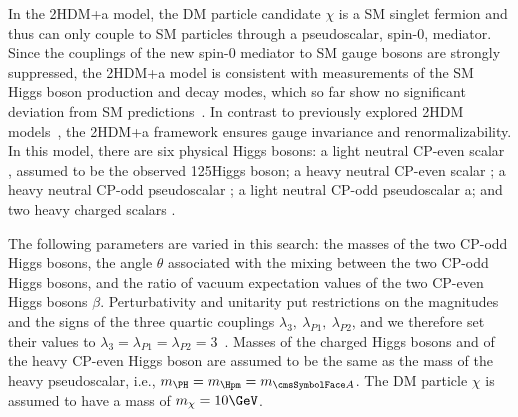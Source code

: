 In the 2HDM+a model, the DM particle candidate $\chi$ is a SM singlet
fermion and thus can only couple to SM particles through a
pseudoscalar, spin-0, mediator. Since the couplings of the new spin-0
mediator to SM gauge bosons are strongly suppressed, the 2HDM+a model
is consistent with  measurements of the SM Higgs boson production and
decay modes, which so far show no significant deviation from SM predictions~\cite{Khachatryan:2016vau}. In contrast to previously explored 2HDM models~\cite{2HDM,Aaboud:2017yqz,Sirunyan:2017hnk}, the 2HDM+a framework ensures gauge invariance and renormalizability. In this model, there are six physical Higgs bosons:
a light neutral CP-even scalar \Ph, assumed to be the
observed 125\GeV Higgs boson; a heavy neutral CP-even scalar \PH;
a heavy neutral CP-odd pseudoscalar \Az; a light neutral CP-odd pseudoscalar a; and two heavy charged scalars \Hpm. 


The following parameters are varied in this search: the masses of the
two CP-odd Higgs bosons, the angle $\theta$ associated with the mixing
between the two CP-odd Higgs bosons, and the ratio of vacuum
expectation values of the two CP-even Higgs bosons $\beta$.
Perturbativity and unitarity put restrictions on the magnitudes and the
signs of the three quartic couplings
$\lambda_3,~\lambda_{P1},~\lambda_{P2}$,
and we therefore set their values to $\lambda_3=\lambda_{P1}=\lambda_{P2}=3$~\cite{Bauer2017}. Masses of the charged Higgs bosons and of the heavy CP-even Higgs boson are assumed to be the same as the mass of the heavy pseudoscalar, i.e., $m_{\PH}=m_{\Hpm}=m_{\Az}$. The DM particle $\chi$ is assumed to have a mass of $m_\chi=10\GeV$.


